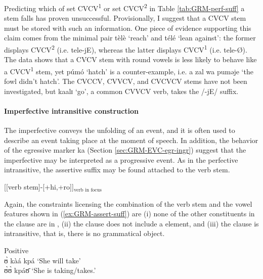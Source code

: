 \begin{exe}
\begin{exe}
\begin{exe}
\begin{exe}
\begin{exe}
\begin{exe}
\begin{exe}
\begin{exe}
\begin{exe}
\begin{exe}
\begin{exe}
Predicting  which of 
set CVCV\textsuperscript{1} or set CVCV\textsuperscript{2} in Table 
\ref{tab:GRM-perf-suff}  a
stem falls  has proven unsuccessful. Provisionally,  I suggest that a CVCV
stem must be stored with such an information. One piece of evidence
supporting this claim comes from
the minimal pair {\sls tèlè} `reach' and  {\sls télé} `lean against':  the
former displays CVCV\textsuperscript{2} (i.e. tele-jE),  whereas the latter 
displays CVCV\textsuperscript{1}
(i.e. tele-\O).  The data shows that a  CVCV stem with round vowels is less 
likely to
behave like a CVCV\textsuperscript{1} stem, yet {\sls púmó} `hatch' is a 
counter-example, i.e.
{\sls a zal wa puməje} `the fowl didn't hatch'. The CVCCV, CVVCV, and CVCVCV 
stems
have  not been investigated, but {\sls kaalɪ} `go', a common  CVVCV verb, takes
the
/-jE/ suffix.  


\paragraph{Imperfective intransitive construction}
\label{sec:GRM-verb-imperf-intran}

The imperfective  conveys the unfolding of an event, and it is often used to describe an event taking place at the moment of speech. In addition, the behavior of the egressive marker {\sls ka} (Section \ref{sec:GRM-EVC-egr-ingr}) suggest that the imperfective may be interpreted as a progressive event. As in the perfective intransitive, the assertive suffix may be found attached to the verb stem. 

\ea\label{ex:GRM-assert-suff}
{\rm [[{verb stem}]-[{\sc +hi,+ro}]]$_\textrm{verb in focus}$}
\z

Again, the constraints licensing the combination of the verb stem and the vowel features  shown in (\ref{ex:GRM-assert-suff})   are (i) none of the other constituents in the clause are in , (ii) the clause does not include a  element, and (iii) the clause is intransitive, that is, there is no grammatical object. 





\ea\label{ex:GRM-pos-neg-take}
\ea\label{ex:GRM-ipfv-out-pos}{\rm Positive}\\
 ʊ̀ kàá kpá  {\rm `She will take'}\\
   ʊ̀ʊ̀ kpáʊ̄ {\rm `She  is taking/takes.'}


\end{exe}
\end{exe}
\end{exe}
\end{exe}
\end{exe}
\end{exe}
\end{exe}
\end{exe}
\end{exe}
\end{exe}
\end{exe}
